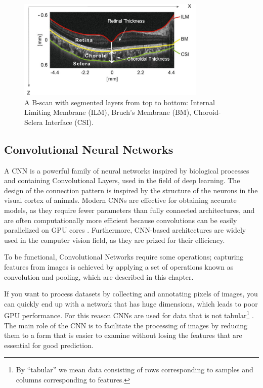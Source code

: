 \documentclass[12pt,a4paper]{scrartcl}
\begin{document}
\begin{figure}[H]
    \centering
    \includegraphics[width=0.8\textwidth]{./images/OCT-Scan.png}
    \caption{A B-scan with segmented layers from top to bottom:  Internal Limiting Membrane (ILM),  Bruch's Membrane (BM), Choroid-Sclera Interface (CSI). \cite{Ronchetti2019}}
    \label{fig:annotated-oct-scan}
\end{figure}

\subsection{Convolutional Neural Networks}\label{s:cnn}

A CNN is a powerful family of neural networks inspired by biological processes and containing Convolutional Layers, used in the field of deep learning. The design of the connection pattern is inspired by the structure of the neurons in the visual cortex of animals. Modern CNNs are effective for obtaining accurate models, as they require fewer parameters than fully connected architectures, and are often computationally more efficient because convolutions can be easily parallelized on GPU cores \cite{DIDLBook}. Furthermore, CNN-based architectures are widely used in the computer vision field, as they are prized for their efficiency. 

To be functional, Convolutional Networks require some operations; capturing features from images is achieved by applying a set of operations known as convolution and pooling, which are described in this chapter. 

If you want to process datasets by collecting and annotating pixels of images, you can quickly end up with a network that has huge dimensions, which leads to poor GPU performance. For this reason CNNs are used for data that is not tabular\footnote{By ``tabular'' we mean data consisting of rows corresponding to samples and columns corresponding to features.} \cite{DIDLBook}. The main role of the CNN is to facilitate the processing of images by reducing them to a form that is easier to examine without losing the features that are essential for good prediction.
\end{document}
